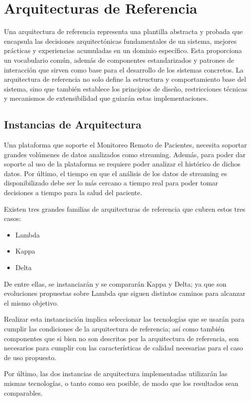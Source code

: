 \section{Arquitecturas de Referencia}

Una arquitectura de referencia representa una plantilla abstracta y probada que encapsula las decisiones arquitectónicas fundamentales de un sistema, 
mejores prácticas y experiencias acumuladas en un dominio específico. 
Esta proporciona un vocabulario común, además de componentes estandarizados y patrones de interacción que sirven como base para el desarrollo de los sistemas concretos. 
La arquitectura de referencia no solo define la estructura y comportamiento base del sistema, sino que también establece los principios de diseño, 
restricciones técnicas y mecanismos de extensibilidad que guiarán estas implementaciones.

\subsection{Instancias de Arquitectura}

Una plataforma que soporte el Monitoreo Remoto de Pacientes, necesita soportar grandes volúmenes de datos analizados como streaming.
Además, para poder dar soporte al uso de la plataforma se requiere poder analizar el histórico de dichos datos. 
Por último, el tiempo en que el análisis de los datos de streaming es disponibilizado debe ser lo más cercano a tiempo real para poder tomar 
decisiones a tiempo para la salud del paciente. 

Existen tres grandes familias de arquitecturas de referencia que cubren estos tres casos: 
\begin{itemize}
    \item Lambda
    \item Kappa
    \item Delta
\end{itemize}

De entre ellas, se instanciarán y se compararán Kappa y Delta; ya que son evoluciones propuestas sobre Lambda que siguen distintos caminos para alcanzar el mismo objetivo.
 
Realizar esta instanciación implica seleccionar las tecnologías que se usarán para cumplir las condiciones de la arquitectura de referencia; 
así como también componentes que si bien no son descritos por la arquitectura de referencia, son necesarios para cumplir con las características de calidad
necesarias para el caso de uso propuesto.

Por último, las dos instancias de arquitectura implementadas utilizarán las mismas tecnologías, o tanto como sea posible, de modo que los resultados sean comparables.  